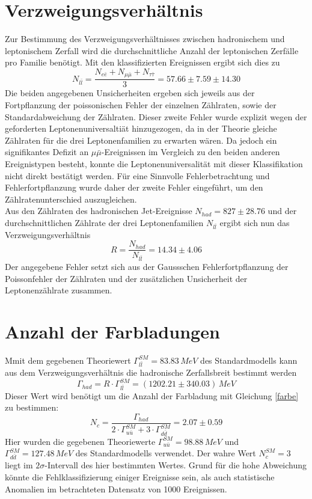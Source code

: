 \documentclass{include/thesisclass3}
\newcommand{\cc}{\cdot}
\newcommand{\e}[1]{\,\si{#1}}
\begin{document}
\section{Verzweigungsverhältnis}
Zur Bestimmung des Verzweigungsverhältnisses zwischen hadronischem und leptonischem Zerfall wird die durchschnittliche Anzahl der leptonischen Zerfälle pro Familie benötigt. Mit den klassifizierten Ereignissen ergibt sich dies zu
\[ N_{l \bar l} = \frac{N_{e\bar e} + N_{\mu \bar\mu} + N_{\tau \bar \tau}}{3} = 57.66 \pm 7.59 \pm 14.30\]
Die beiden angegebenen Unsicherheiten ergeben sich jeweils aus der Fortpflanzung der poissonischen Fehler der einzelnen Zählraten, sowie der Standardabweichung der Zählraten. 
Dieser zweite Fehler wurde explizit wegen der geforderten Leptonenuniversaltiät hinzugezogen, da in der Theorie gleiche Zählraten für die drei Leptonenfamilien zu erwarten wären.
Da jedoch ein signifikantes Defizit an $\mu \bar \mu$-Ereignissen im Vergleich zu den beiden anderen Ereignistypen besteht, konnte die Leptonenuniversalität mit dieser Klassifikation nicht direkt bestätigt werden.
Für eine Sinnvolle Fehlerbetrachtung und Fehlerfortpflanzung wurde daher der zweite Fehler eingeführt, um den Zählratenunterschied auszugleichen.\\
Aus den Zählraten des hadronischen Jet-Ereignisse $N_{had} = 827\pm 28.76$ und der durchschnittlichen Zählrate der drei Leptonenfamilien $N_{l \bar l}$ ergibt sich nun das Verzweigungsverhältnis
\[ 
R = \frac{ N_{had}}{N_{l \bar l}} = 14.34 \pm 4.06\]
Der angegebene Fehler setzt sich aus der Gaussschen Fehlerfortpflanzung der Poissonfehler der Zählraten und der zusätzlichen Unsicherheit der Leptonenzählrate zusammen.

\section{Anzahl der Farbladungen}
Mmit dem gegebenen Theoriewert $\Gamma^{SM}_{l \bar l} = 83.83\e{MeV}$ des Standardmodells kann aus dem Verzweigungsverhältnis die hadronische Zerfallsbreit bestimmt werden
\[\Gamma_{had} = R \cc \Gamma^{SM}_{l \bar l} =  (1202.21 \pm 340.03)\e{MeV}\]
Dieser Wert wird benötigt um die Anzahl der Farbladung mit Gleichung \ref{farbe} zu bestimmen:
\[ N_c = \frac{\Gamma_{had}}{2\cc \Gamma^{SM}_{u\bar u} + 3 \cc \Gamma^{SM}_{d \bar d}} = 2.07 \pm 0.59\]
Hier wurden die gegebenen Theoriewerte $\Gamma_{u\bar u}^{SM}=98.88\e{MeV}$ und $\Gamma_{d \bar d}^{SM}=127.48\e{MeV}$ des Standardmodells verwendet. Der wahre Wert $N_c^{SM} = 3$ liegt im $2\sigma$-Intervall des hier bestimmten Wertes. Grund für die hohe Abweichung könnte die Fehlklassifizierung einiger Ereignisse sein, als auch statistische Anomalien im betrachteten Datensatz von 1000 Ereignissen.
\end{document}
